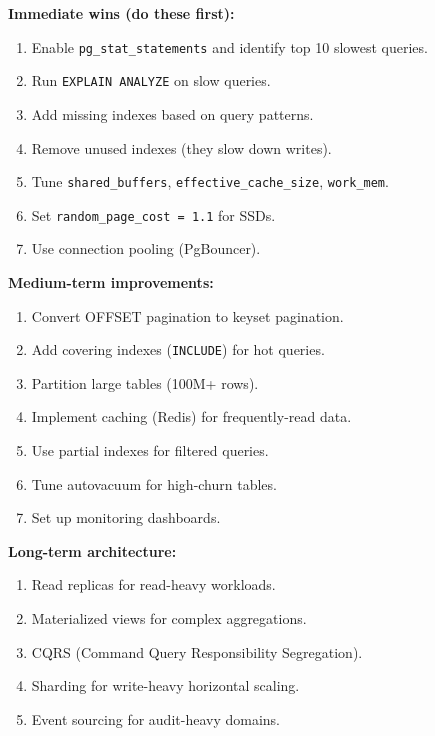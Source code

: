 \documentclass[12pt,a4paper]{article}
\begin{document}
\begin{tipbox}
\textbf{Immediate wins (do these first):}
\begin{enumerate}
    \item Enable \texttt{pg\_stat\_statements} and identify top 10 slowest queries.
    \item Run \texttt{EXPLAIN ANALYZE} on slow queries.
    \item Add missing indexes based on query patterns.
    \item Remove unused indexes (they slow down writes).
    \item Tune \texttt{shared\_buffers}, \texttt{effective\_cache\_size}, \texttt{work\_mem}.
    \item Set \texttt{random\_page\_cost = 1.1} for SSDs.
    \item Use connection pooling (PgBouncer).
\end{enumerate}

\textbf{Medium-term improvements:}
\begin{enumerate}
    \item Convert OFFSET pagination to keyset pagination.
    \item Add covering indexes (\texttt{INCLUDE}) for hot queries.
    \item Partition large tables (100M+ rows).
    \item Implement caching (Redis) for frequently-read data.
    \item Use partial indexes for filtered queries.
    \item Tune autovacuum for high-churn tables.
    \item Set up monitoring dashboards.
\end{enumerate}

\textbf{Long-term architecture:}
\begin{enumerate}
    \item Read replicas for read-heavy workloads.
    \item Materialized views for complex aggregations.
    \item CQRS (Command Query Responsibility Segregation).
    \item Sharding for write-heavy horizontal scaling.
    \item Event sourcing for audit-heavy domains.
\end{enumerate}
\end{tipbox}


\end{document}
